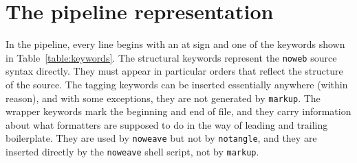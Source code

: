 \documentclass{article}
\begin{document}
\section{The pipeline representation}

In the pipeline, every line begins with an at sign and one of the
keywords shown in Table~\ref{table:keywords}.
The structural keywords 
represent the {\tt noweb} source syntax directly.
They must appear in particular orders that reflect the
structure of the source.
The tagging keywords can be inserted
essentially anywhere (within reason), and with some exceptions, they are not generated
by {\tt markup}.
The wrapper keywords
mark the beginning and end of file,
and they carry information about what formatters are supposed to do in
the way of leading and trailing boilerplate.
They are used by {\tt noweave} but not by {\tt notangle}, and they are
inserted directly by the {\tt noweave} shell script, not by {\tt markup}.
\end{document}
